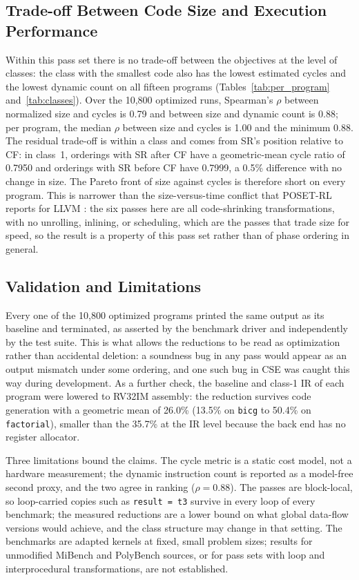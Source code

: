 \documentclass[conference,a4paper]{IEEEtran}
\begin{document}
\subsection{Trade-off Between Code Size and Execution Performance}
\label{sec:tradeoff}
Within this pass set there is no trade-off between the objectives at the level of classes: the class with the smallest code also has the lowest estimated cycles and the lowest dynamic count on all fifteen programs (Tables~\ref{tab:per_program} and~\ref{tab:classes}). Over the 10,800 optimized runs, Spearman's $\rho$ between normalized size and cycles is 0.79 and between size and dynamic count is 0.88; per program, the median $\rho$ between size and cycles is 1.00 and the minimum 0.88. The residual trade-off is within a class and comes from SR's position relative to CF: in class~1, orderings with SR after CF have a geometric-mean cycle ratio of 0.7950 and orderings with SR before CF have 0.7999, a 0.5\% difference with no change in size. The Pareto front of size against cycles is therefore short on every program. This is narrower than the size-versus-time conflict that POSET-RL reports for LLVM \cite{ref8}: the six passes here are all code-shrinking transformations, with no unrolling, inlining, or scheduling, which are the passes that trade size for speed, so the result is a property of this pass set rather than of phase ordering in general.

\subsection{Validation and Limitations}
\label{sec:validation}
Every one of the 10,800 optimized programs printed the same output as its baseline and terminated, as asserted by the benchmark driver and independently by the test suite. This is what allows the reductions to be read as optimization rather than accidental deletion: a soundness bug in any pass would appear as an output mismatch under some ordering, and one such bug in CSE was caught this way during development. As a further check, the baseline and class-1 IR of each program were lowered to RV32IM assembly: the reduction survives code generation with a geometric mean of 26.0\% (13.5\% on \texttt{bicg} to 50.4\% on \texttt{factorial}), smaller than the 35.7\% at the IR level because the back end has no register allocator.

Three limitations bound the claims. The cycle metric is a static cost model, not a hardware measurement; the dynamic instruction count is reported as a model-free second proxy, and the two agree in ranking ($\rho = 0.88$). The passes are block-local, so loop-carried copies such as \texttt{result = t3} survive in every loop of every benchmark; the measured reductions are a lower bound on what global data-flow versions would achieve, and the class structure may change in that setting. The benchmarks are adapted kernels at fixed, small problem sizes; results for unmodified MiBench and PolyBench sources, or for pass sets with loop and interprocedural transformations, are not established.
\end{document}
